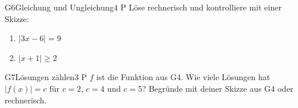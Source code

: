 \documentclass[11pt]{article}
\begin{document}
\begin{lpaufgabe}{G6}{Gleichung und Ungleichung}{4 P}
Löse rechnerisch und kontrolliere mit einer Skizze:
\begin{enumerate}[label=(\alph*),leftmargin=*,itemsep=1pt]
\item $|3x - 6| = 9$
\item $|x + 1| \ge 2$
\end{enumerate}
\end{lpaufgabe}

\begin{lpaufgabe}{G7}{Lösungen zählen}{3 P}
$f$ ist die Funktion aus G4. Wie viele Lösungen hat $|f(x)| = c$ für $c = 2$, $c = 4$ und $c = 5$? Begründe mit deiner Skizze aus G4 oder rechnerisch.
\end{lpaufgabe}
\end{document}
